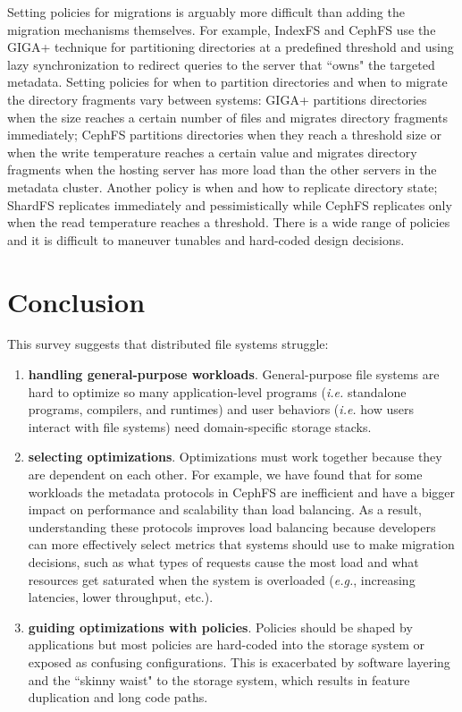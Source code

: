 Setting policies for migrations is arguably more difficult than adding the
migration mechanisms themselves.  For example, IndexFS and CephFS use the GIGA+
technique for partitioning directories at a predefined threshold and using lazy
synchronization to redirect queries to the server that ``owns" the targeted
metadata.  Setting policies for when to partition directories and when to
migrate the directory fragments vary between systems: GIGA+ partitions
directories when the size reaches a certain number of files and migrates
directory fragments immediately; CephFS partitions directories when they reach
a threshold size or when the write temperature reaches a certain value and
migrates directory fragments when the hosting server has more load than the
other servers in the metadata cluster. Another policy is when and how to
replicate directory state; ShardFS replicates immediately and pessimistically
while CephFS replicates only when the read temperature reaches a threshold.
There is a wide range of policies and it is difficult to maneuver tunables and
hard-coded design decisions.

\section{Conclusion}

This survey suggests that distributed file systems struggle:

\begin{enumerate}

\item \textbf{handling general-purpose workloads}. General-purpose file systems
are hard to optimize so many application-level programs ({\it i.e.} standalone
programs, compilers, and runtimes) and user behaviors ({\it i.e.} how users
interact with file systems) need domain-specific storage stacks.

\item \textbf{selecting optimizations}. Optimizations must work together
because they are dependent on each other. For example, we have found that for
some workloads the metadata protocols in CephFS are inefficient and have a
bigger impact on performance and scalability than load balancing.  As a result,
understanding these protocols improves load balancing because developers can
more effectively select metrics that systems should use to make migration
decisions, such as what types of requests cause the most load and what
resources get saturated when the system is overloaded ({\it e.g.}, increasing
latencies, lower throughput, etc.).

\item \textbf{guiding optimizations with policies}. Policies should be shaped
by applications but most policies are hard-coded into the storage system or
exposed as confusing configurations. This is exacerbated by software layering
and the ``skinny waist" to the storage system, which results in feature
duplication and long code paths.

\end{enumerate}

